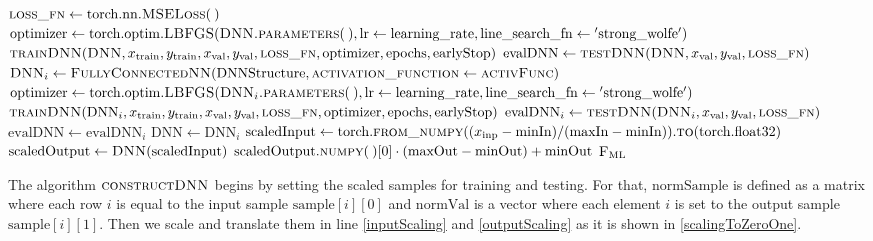 \begin{algorithm}[H]
\begin{algorithmic}[1]
\State $\textproc{loss\_fn} \gets \mathrm{torch.nn.}\Call{MSELoss}{\:}$
\State $\mathrm{optimizer} \gets \mathrm{torch.optim.}\Call{LBFGS}{\protect\Call{DNN.parameters}{\:}, \mathrm{lr}\gets\mathrm{learning\_rate}, \mathrm{line\_search\_fn}\gets\mathrm{'strong\_wolfe'}}$
\State $\Call{trainDNN}{\textproc{DNN}, x_\mathrm{train}, y_\mathrm{train}, x_\mathrm{val}, y_\mathrm{val}, \textproc{loss\_fn}, \mathrm{optimizer}, \mathrm{epochs}, \mathrm{earlyStop}}$
\State\label{defEvalDNN} $\mathrm{evalDNN} \gets \Call{testDNN}{\textproc{DNN}, x_\mathrm{val}, y_\mathrm{val}, \textproc{loss\_fn}}$
\State $\textproc{DNN}_i \gets \Call{FullyConnectedNN}{\mathrm{DNNStructure}, \textproc{activation\_function}\gets\textproc{activFunc}}$
\State $\mathrm{optimizer} \gets \mathrm{torch.optim.}\Call{LBFGS}{\protect\Call{DNN$_i$.parameters}{\:}, \mathrm{lr}\gets\mathrm{learning\_rate}, \mathrm{line\_search\_fn}\gets\mathrm{'strong\_wolfe'}}$
\State $\Call{trainDNN}{\mathrm{DNN}_i, x_\mathrm{train}, y_\mathrm{train}, x_\mathrm{val}, y_\mathrm{val}, \textproc{loss\_fn}, \mathrm{optimizer}, \mathrm{epochs}, \mathrm{earlyStop}}$
\State $\mathrm{evalDNN}_i \gets \Call{testDNN}{\textproc{DNN}_i, x_\mathrm{val}, y_\mathrm{val}, \textproc{loss\_fn}}$
\State $\mathrm{evalDNN} \gets \mathrm{evalDNN}_i$
\State $\mathrm{DNN} \gets \mathrm{DNN}_i$
\EndIf
\EndFor
\State $\mathrm{scaledInput} \gets \mathrm{torch.}\Call{from\_numpy}{(x_\mathrm{inp}-\mathrm{minIn})/(\mathrm{maxIn}-\mathrm{minIn})}.\Call{to}{\mathrm{torch.float32}}$
\State $\mathrm{scaledOutput} \gets \Call{DNN}{\mathrm{scaledInput}}$
\State \Return $\mathrm{scaledOutput.}\Call{numpy}{\:}[0]\cdot(\mathrm{maxOut}-\mathrm{minOut})+\mathrm{minOut}$
\EndFunction
\State \Return $\textproc{F$_\mathrm{ML}$}$
\EndFunction
\end{algorithmic}
\end{algorithm}

The algorithm $\textproc{constructDNN}$ begins by setting the scaled samples for training and testing. For that, $\mathrm{normSample}$ is defined as a matrix where each row $i$ is equal to the input sample $\mathrm{sample}[i][0]$ and $\mathrm{normVal}$ is a vector where each element $i$ is set to the output sample $\mathrm{sample}[i][1]$. Then we scale and translate them in line \ref{inputScaling} and \ref{outputScaling} as it is shown in \eqref{scalingToZeroOne}.

